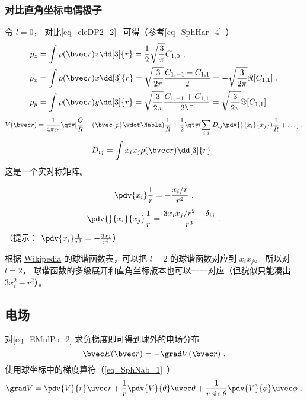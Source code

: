 \subsubsection{对比直角坐标电偶极子}
令 $l=0$， 对比\autoref{eq_eleDP2_2}~ 可得（参考\autoref{eq_SphHar_4}~）
\begin{align}\label{eq_EMulPo_6} %
p_z &= \int\rho(\bvec r)z\dd[3]{r} = \frac12\sqrt{\frac{3}{\pi}} C_{1,0}~,\\
p_x &= \int\rho(\bvec r)x\dd[3]{r} = \sqrt{\frac{3}{2\pi}} \frac{C_{1,-1}-C_{1,1}}{2} = -\sqrt{\frac{3}{2\pi}} \Re[C_{1,1}]~,\\
p_y &= \int\rho(\bvec r)y\dd[3]{r} = \sqrt{\frac{3}{2\pi}} \frac{C_{1,-1}+C_{1,1}}{2\I} = \sqrt{\frac{3}{2\pi}} \Im[C_{1,1}]~.
\end{align}
\begin{equation}
V(\bvec r) = \frac{1}{4\pi\epsilon_0} \qty[\frac{Q}{R} - (\bvec{p} \vdot \Nabla)\frac{1}{R} + \frac{1}{2}\qty(\sum_{i,j} D_{ij}\pdv{}{x_i}{x_j})\frac{1}{R} + \dots]~.
\end{equation}
\begin{equation}
D_{ij}= \int x_i x_j \rho(\bvec r) \dd[3]{r}~.
\end{equation}
这是一个实对称矩阵。

\begin{equation}
\pdv{x_i}\frac{1}{r} = -\frac{x_i/r}{r^2}~.
\end{equation}
\begin{equation}
\pdv{}{x_i}{x_j}\frac{1}{r} = \frac{3x_ix_j/r^2 - \delta_{ij}}{r^3}~.
\end{equation}
（提示： $\pdv{x_i}\frac{1}{r^3} = -\frac{3x_i}{r^5}$）

根据 \href{https://en.wikipedia.org/wiki/Table_of_spherical_harmonics}{Wikipedia} 的球谐函数表，可以把 $l=2$ 的球谐函数对应到 $x_ix_j$。 所以对 $l=2$， 球谐函数的多级展开和直角坐标版本也可以一一对应（但貌似只能凑出 $3x_i^2-r^2$）。

\subsection{电场}
对\autoref{eq_EMulPo_2} 求负梯度即可得到球外的电场分布
\begin{equation}
\bvec E(\bvec r) = -\grad V(\bvec r)~.
\end{equation}
使用球坐标中的梯度算符（\autoref{eq_SphNab_1}~）
\begin{equation}
\grad V = \pdv{V}{r}\uvec r + \frac{1}{r} \pdv{V}{\theta}\uvec \theta  + \frac{1}{r\sin \theta }\pdv{V}{\phi}\uvec \phi~.
\end{equation}

